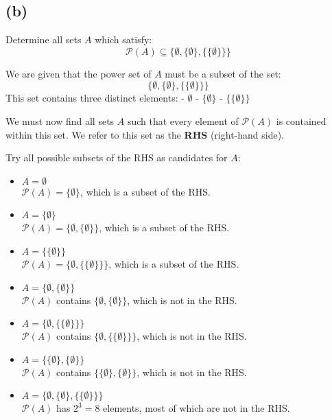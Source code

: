 \documentclass{article}
\begin{document}
\subsection*{(b)}

Determine all sets $A$ which satisfy:
\[
\mathcal{P}(A) \subseteq \{\emptyset, \{\emptyset\}, \{\{\emptyset\}\}\}
\]

We are given that the power set of $A$ must be a subset of the set:
\[
\{\emptyset, \{\emptyset\}, \{\{\emptyset\}\}\}
\]
This set contains three distinct elements:
- $\emptyset$
- $\{\emptyset\}$
- $\{\{\emptyset\}\}$

We must now find all sets $A$ such that every element of $\mathcal{P}(A)$ is contained within this set.  
We refer to this set as the \textbf{RHS} (right-hand side).

Try all possible subsets of the RHS as candidates for $A$:

\begin{itemize}
  \item $A = \emptyset$\\
  $\mathcal{P}(A) = \{\emptyset\}$, which is a subset of the RHS.

  \item $A = \{\emptyset\}$\\
  $\mathcal{P}(A) = \{\emptyset, \{\emptyset\}\}$, which is a subset of the RHS.

  \item $A = \{\{\emptyset\}\}$\\
  $\mathcal{P}(A) = \{\emptyset, \{\{\emptyset\}\}\}$, which is a subset of the RHS.

  \item $A = \{\emptyset, \{\emptyset\}\}$\\
  $\mathcal{P}(A)$ contains $\{\emptyset, \{\emptyset\}\}$, which is not in the RHS.

  \item $A = \{\emptyset, \{\{\emptyset\}\}\}$\\
  $\mathcal{P}(A)$ contains $\{\emptyset, \{\{\emptyset\}\}\}$, which is not in the RHS.

  \item $A = \{\{\emptyset\}, \{\emptyset\}\}$\\
  $\mathcal{P}(A)$ contains $\{\{\emptyset\}, \{\emptyset\}\}$, which is not in the RHS.

  \item $A = \{\emptyset, \{\emptyset\}, \{\{\emptyset\}\}\}$\\
  $\mathcal{P}(A)$ has $2^3 = 8$ elements, most of which are not in the RHS.
\end{itemize}
\end{document}
